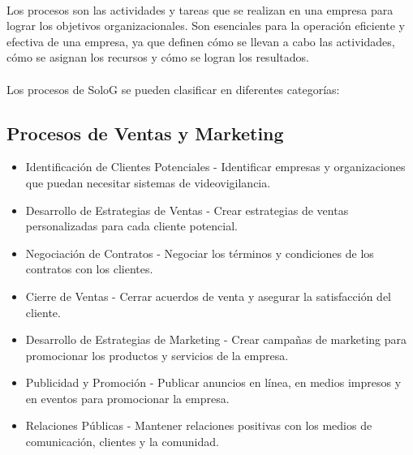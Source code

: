 \documentclass{report}
\begin{document}
          \paragraph*{}
          {
            Los procesos son las actividades y tareas que se realizan en una empresa para lograr los objetivos organizacionales. 
            Son esenciales para la operación eficiente y efectiva de una empresa, ya que definen cómo se llevan a cabo las actividades, cómo se asignan los recursos y cómo se logran los resultados.
          }
          \paragraph*{}
          {
            Los procesos de SoloG se pueden clasificar en diferentes categorías:
          }
          \subsection{Procesos de Ventas y Marketing}
            \begin{itemize}
              \item Identificación de Clientes Potenciales - Identificar empresas y organizaciones que puedan necesitar sistemas de videovigilancia.
              \item Desarrollo de Estrategias de Ventas - Crear estrategias de ventas personalizadas para cada cliente potencial.
              \item Negociación de Contratos - Negociar los términos y condiciones de los contratos con los clientes.
              \item Cierre de Ventas - Cerrar acuerdos de venta y asegurar la satisfacción del cliente.
              \item Desarrollo de Estrategias de Marketing - Crear campañas de marketing para promocionar los productos y servicios de la empresa.
              \item Publicidad y Promoción - Publicar anuncios en línea, en medios impresos y en eventos para promocionar la empresa.
              \item Relaciones Públicas - Mantener relaciones positivas con los medios de comunicación, clientes y la comunidad.
            \end{itemize}
\end{document}
